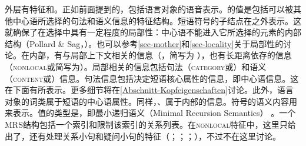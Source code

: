 \z
外层有特征\phonc 和\synsemc。正如前面提到的，\phonc 包括语言对象的语音表示。\synsemc 的值是包括可以被其他中心语所选择的句法和语义信息的特征结构。短语符号的子结点在\synsemc 之外表示。这就确保了在选择中具有一定程度的局部性：中心语不能进入它所选择的元素的内部结构（Pollard \& Sag\citeyear[--145]{ps}，\citeyear[]{ps2}）。也可以参考\ref{sec-mother}和\ref{sec-locality}关于局部性的讨论。在\synsemc 内部，有与局部上下文相关的信息（\localc，简写为\loc
），也有长距离依存的信息（\textsc{nonlocal}或简写为\nonlocc）。局部相关的信息包括句法（\textsc{category}或\catc）和语义（\textsc{content}或\contc）信息。句法信息包括决定短语核心属性的信息，即中心语信息。这在\headc 下面有所表示。更多细节将在\ref{Abschnitt-Kopfeigenschaften}讨论。此外，语言对象的词类属于短语的中心语属性。同样，\headc、\subcatc 属于\catc 内部的信息。符号的语义内容用\contc 来表示。\contc 值的类型是，即最小递归语义（Minimal Recursion Semantics）\indexmrsc
\citep*{CFPS2005a}。一个MRS结构包括一个索引和限制该索引的关系列表。在\textsc{nonlocal}特征中，这里只给出了\slasch ，还有处理关系小句和疑问小句的特征（\citealp{ps2}；\citealp{Sag97a}；\citealp{GSag2000a-u}；\citealp{Holler2005a-u}），不过不在这里讨论。
